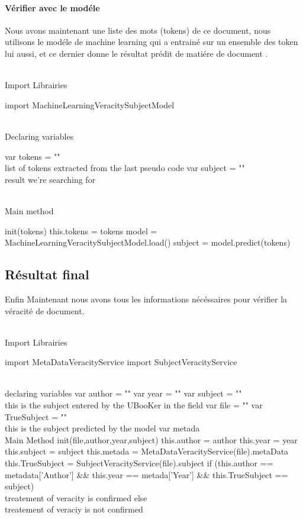 \documentclass[12pt]{report}
\begin{document}
\paragraph{Vérifier avec le modéle}
Nous avons maintenant une liste des mots (tokens) de ce document, nous utilisons le modéle de machine learning qui a entrainé sur un ensemble des token lui aussi, et ce dernier donne le résultat prédit de matiére de document .
\begin{customFrame}

\\ Import Librairies

import MachineLearningVeracitySubjectModel

\\ Declaring variables

var tokens = "" \\ list of tokens extracted from the last pseudo code
var subject = "" \\ result we're searching for

\\ Main method

init(tokens) {
	this.tokens = tokens
	model = MachineLearningVeracitySubjectModel.load()
	subject = model.predict(tokens)
}

\end{customFrame}

\subsection{Résultat final}
Enfin Maintenant nous avons tous les informations nécéssaires pour vérifier la véracité de document. 

\begin{customFrame}
\\ Import Librairies

import MetaDataVeracityService
import SubjectVeracityService

\\ declaring variables 
var author = ""
var year = ""
var subject = "" \\ this is the subject entered by the UBooKer in the field
var file = ""
var TrueSubject = ""\\this is the subject predicted by the model
var metada 
\\ Main Method
init(file,author,year,subject) {
	this.author = author
	this.year = year
	this.subject = subject
	this.metada = MetaDataVeracityService(file).metaData
	this.TrueSubject = SubjectVeracityService(file).subject
	if (this.author == metadata['Author'] && this.year == metada['Year'] && this.TrueSubject ==  subject) {
		\\ treatement of veracity is confirmed
	} else {
		\\ treatement of veraciy is not confirmed
	}
}
\end{customFrame}
\end{document}
